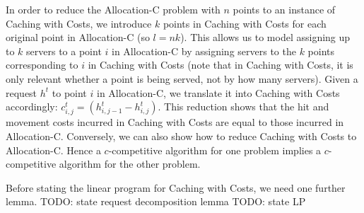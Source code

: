 In order to reduce the Allocation-C problem with $n$ points to an instance of Caching with Costs, we introduce $k$ points in Caching with Costs for each original point in Allocation-C (so $l = nk$).
This allows us to model assigning up to $k$ servers to a point $i$ in Allocation-C by assigning servers to the $k$ points corresponding to $i$ in Caching with Costs (note that in Caching with Costs, it is only relevant whether a point is being served, not by how many servers).
Given a request $h^t$ to point $i$ in Allocation-C, we translate it into Caching with Costs accordingly: $c^t_{i,j} = (h^t_{i,j-1} - h_{i,j}^t)$.
This reduction shows that the hit and movement costs incurred in Caching with Costs are equal to those incurred in Allocation-C.
Conversely, we can also show how to reduce Caching with Costs to Allocation-C.
Hence a $c$-competitive algorithm for one problem implies a $c$-competitive algorithm for the other problem.

Before stating the linear program for Caching with Costs, we need one further lemma.
TODO: state request decomposition lemma
TODO: state LP

